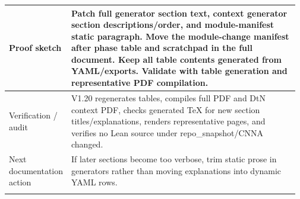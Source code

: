 \begin{longtable}{L{0.16\linewidth} L{0.81\linewidth}}
\hline\addlinespace[0.20em]
Proof sketch & Patch full generator section text, context generator section descriptions/\allowbreak{}order, and module-manifest static paragraph. Move the module-change manifest after phase table and scratchpad in the full document. Keep all table contents generated from YAML/\allowbreak{}exports. Validate with table generation and representative PDF compilation.\\
\hline\addlinespace[0.20em]
Verification /\allowbreak{} audit & V1.20 regenerates tables, compiles full PDF and DtN context PDF, checks generated TeX for new section titles/\allowbreak{}explanations, renders representative pages, and verifies no Lean source under repo\_snapshot/\allowbreak{}CNNA changed.\\
\hline\addlinespace[0.20em]
Next documentation action & If later sections become too verbose, trim static prose in generators rather than moving explanations into dynamic YAML rows.\\
\hline\addlinespace[0.20em]
\end{longtable}
